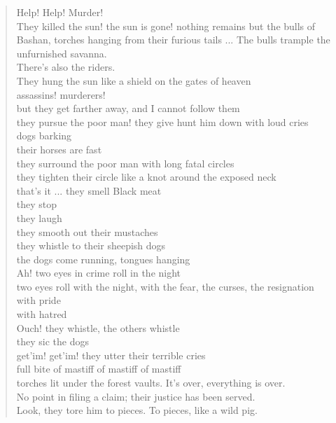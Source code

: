 \documentclass[letterpaper,article,12pt,oneside,notitlepage]{memoir}
\begin{document}
\begin{verse}
Help! Help! Murder! \\
They killed the sun! the sun is gone! nothing remains but the bulls of Bashan, torches hanging from their furious tails ... The bulls trample the unfurnished savanna. \\
There's also the riders. \\
They hung the sun like a shield on the gates of heaven \\
assassins! murderers! \\
but they get farther away, and I cannot follow them \\
they pursue the poor man! they give hunt him down with loud cries \\
dogs barking \\
their horses are fast \\
they surround the poor man with long fatal circles \\
they tighten their circle like a knot around the exposed neck \\
that's it ... they smell Black meat \\
they stop \\
they laugh \\
they smooth out their mustaches \\
they whistle to their sheepish dogs \\
the dogs come running, tongues hanging \\
Ah! two eyes in crime roll in the night \\
two eyes roll with the night, with the fear, the curses, the resignation \\
with pride \\
with hatred \\
Ouch! they whistle, the others whistle \\
they sic the dogs \\
get'im! get'im! they utter their terrible cries \\
full bite of mastiff of mastiff of mastiff \\
torches lit under the forest vaults. It's over, everything is over. \\
\hspace{1cm} No point in filing a claim; their justice has been served. \\
Look, they tore him to pieces. To pieces, like a wild pig. \\
\end{verse}

\clearpage
\end{document}
